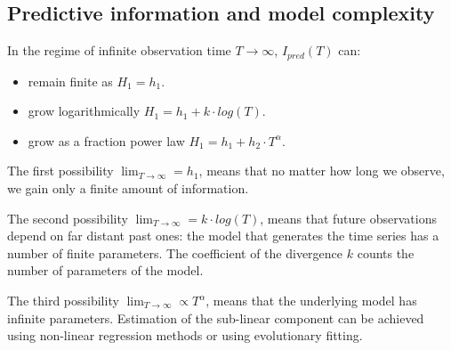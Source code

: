 \subsection{Predictive information and model complexity}
In the regime of infinite observation time $T\rightarrow \infty$, $I_{pred}(T)$ can:
\begin{itemize}
 \item remain finite as $H_1=h_1$.
 \item grow logarithmically $H_1=h_1 + k \cdot log(T)$.
 \item grow as a fraction power law $H_1=h_1 + h_2 \cdot T^{\alpha}$.
\end{itemize}
The first possibility \textbf{$\lim_{T\to\infty}=h_1$}, means that no matter how
 long we observe, we gain only a finite amount of information.

The second possibility \textbf{$\lim_{T\to\infty}= k\cdot log(T)$}, means that future
 observations depend on far distant past ones: the model that generates the time
 series has a number of finite parameters. The coefficient of the divergence $k$
counts the number of parameters of the model.

The third possibility \textbf{$\lim_{T\to\infty} \propto T^{\alpha}$}, means that
the underlying model has infinite parameters.
Estimation of the sub-linear component can be achieved using non-linear regression
 methods or using evolutionary fitting.

